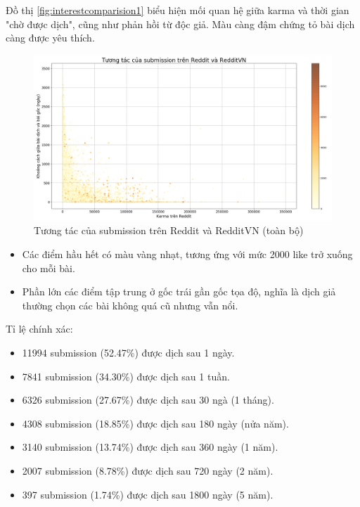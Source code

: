 \documentclass[10pt,a4paper]{article}
\begin{document}
Đồ thị \eqref{fig:interestcomparision1} biểu hiện mối quan hệ giữa karma và thời gian "chờ được dịch", cũng như phản hồi từ độc giả. Màu càng đậm chứng tỏ bài dịch càng được yêu thích.
\begin{figure}[!h]
    \centering
    \includegraphics[width=\textwidth]{img/InterestComparision.png}
    \caption{Tương tác của submission trên Reddit và RedditVN (toàn bộ)}
    \label{fig:interestcomparision1}
\end{figure}
\begin{itemize}
    \item Các điểm hầu hết có màu vàng nhạt, tương ứng với mức 2000 like trở xuống cho mỗi bài.
    \item Phần lớn các điểm tập trung ở gốc trái gần gốc tọa độ, nghĩa là dịch giả thường chọn các bài không quá cũ nhưng vẫn nổi.
\end{itemize}

Tỉ lệ chính xác:
\begin{itemize}
    \item 11994 submission (52.47\%) được dịch sau 1 ngày.
    \item 7841 submission (34.30\%) được dịch sau 1 tuần.
    \item 6326 submission (27.67\%) được dịch sau 30 ngà (1 tháng).
    \item 4308 submission (18.85\%) được dịch sau 180 ngày (nửa năm).
    \item 3140 submission (13.74\%) được dịch sau 360 ngày (1 năm).
    \item 2007 submission (8.78\%) được dịch sau 720 ngày (2 năm).
    \item 397 submission (1.74\%) được dịch sau 1800 ngày (5 năm).
\end{itemize}
\end{document}
